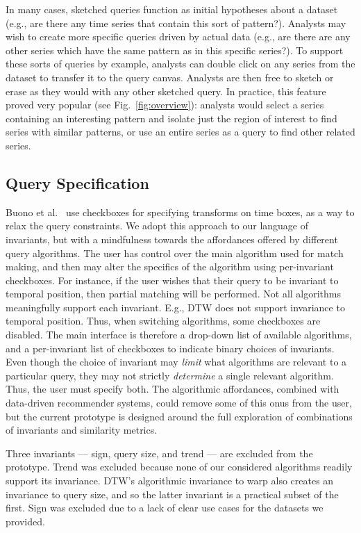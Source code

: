 In many cases, sketched queries function as initial hypotheses about a dataset (e.g., are there any time series that contain this sort of pattern?). Analysts may wish to create more specific queries driven by actual data (e.g., are there are any other series which have the same pattern as in this specific series?). To support these sorts of queries by example, analysts can double click on any series from the dataset to transfer it to the query canvas. Analysts are then free to sketch or erase as they would with any other sketched query. In practice, this feature proved very popular (see Fig.~\ref{fig:overview}): analysts would select a series containing an interesting pattern and isolate just the region of interest to find series with similar patterns, or use an entire series as a query to find other related series. 

\subsection{Query Specification}
\label{sec:query}

Buono et al.~\cite{buono2005interactive} use checkboxes for specifying transforms on time boxes, as a way to relax the query constraints. We adopt this approach to our language of invariants, but with a mindfulness towards the affordances offered by different query algorithms. The user has control over the main algorithm used for match making, and then may alter the specifics of the algorithm using per-invariant checkboxes. For instance, if the user wishes that their query to be invariant to temporal position, then partial matching will be performed. Not all algorithms meaningfully support each invariant. E.g., DTW does not support invariance to temporal position. Thus, when switching algorithms, some checkboxes are disabled. The main interface is therefore a drop-down list of available algorithms, and a per-invariant list of checkboxes to indicate binary choices of invariants. Even though the choice of invariant may \emph{limit} what algorithms are relevant to a particular query, they may not strictly \emph{determine} a single relevant algorithm. Thus, the user must specify both. The algorithmic affordances, combined with data-driven recommender systems, could remove some of this onus from the user, but the current prototype is designed around the full exploration of combinations of invariants and similarity metrics.

Three invariants --- sign, query size, and trend --- are excluded from the prototype. Trend was excluded because none of our considered algorithms readily support its invariance. DTW's algorithmic invariance to warp also creates an invariance to query size, and so the latter invariant is a practical subset of the first. Sign was excluded due to a lack of clear use cases for the datasets we provided.
\eeboFig

